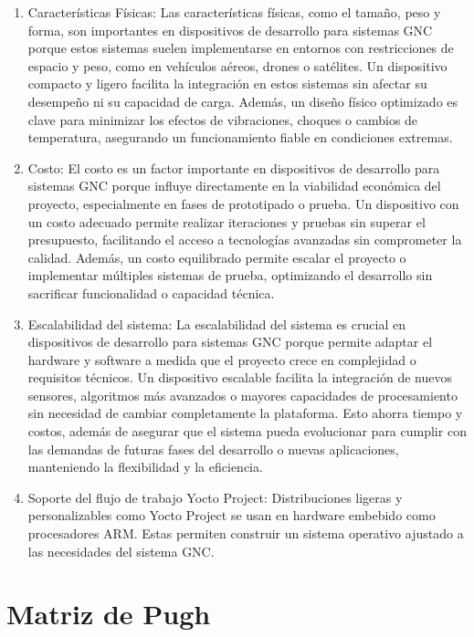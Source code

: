 \begin{enumerate}
    \item Características Físicas: Las características físicas, como el tamaño, peso y forma, son importantes en dispositivos de desarrollo para sistemas GNC porque estos sistemas suelen implementarse en entornos con restricciones de espacio y peso, como en vehículos aéreos, drones o satélites. Un dispositivo compacto y ligero facilita la integración en estos sistemas sin afectar su desempeño ni su capacidad de carga. Además, un diseño físico optimizado es clave para minimizar los efectos de vibraciones, choques o cambios de temperatura, asegurando un funcionamiento fiable en condiciones extremas.

    \item Costo: El costo es un factor importante en dispositivos de desarrollo para sistemas GNC porque influye directamente en la viabilidad económica del proyecto, especialmente en fases de prototipado o prueba. Un dispositivo con un costo adecuado permite realizar iteraciones y pruebas sin superar el presupuesto, facilitando el acceso a tecnologías avanzadas sin comprometer la calidad. Además, un costo equilibrado permite escalar el proyecto o implementar múltiples sistemas de prueba, optimizando el desarrollo sin sacrificar funcionalidad o capacidad técnica.

    \item Escalabilidad del sistema: 
    La escalabilidad del sistema es crucial en dispositivos de desarrollo para sistemas GNC porque permite adaptar el hardware y software a medida que el proyecto crece en complejidad o requisitos técnicos. Un dispositivo escalable facilita la integración de nuevos sensores, algoritmos más avanzados o mayores capacidades de procesamiento sin necesidad de cambiar completamente la plataforma. Esto ahorra tiempo y costos, además de asegurar que el sistema pueda evolucionar para cumplir con las demandas de futuras fases del desarrollo o nuevas aplicaciones, manteniendo la flexibilidad y la eficiencia.

    \item Soporte del flujo de trabajo Yocto Project: 
    Distribuciones ligeras y personalizables como Yocto Project se usan en hardware embebido como procesadores ARM. Estas permiten construir un sistema operativo ajustado a las necesidades del sistema GNC.

\end{enumerate}
\newpage

\section{Matriz de Pugh}

